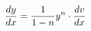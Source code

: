 \documentclass[preview]{standalone}
\begin{document}
\begin{align*}
\special{dvisvgm:raw <g id='unique000'>}\frac{dy}{dx} = \frac{1}{1 - n}y^{n} \cdot \frac{dv}{dx}\special{dvisvgm:raw </g>}
\end{align*}
\end{document}
